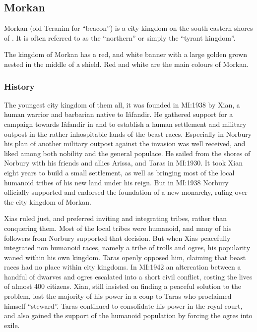 \subsection{Morkan}
\label{sec:Morkan}


Morkan (old Teranim for ``beacon'') is a city kingdom on the south eastern
shores of . It is often referred to as the ``northern''
or simply the ``tyrant kingdom''.

The kingdom of Morkan has a red, and white banner with a large golden grown
nested in the middle of a shield. Red and white are the main colours of
Morkan.

\subsubsection{History}

The youngest city kingdom of them all, it was founded in MI:1938 by Xian, a
human warrior and barbarian native to Iâfandir. He gathered support for a
campaign towards Iâfandir in  and 
to establish a human settlement and military outpost in the rather
inhospitable lands of the beast races. Especially in Norbury his plan of
another military outpost against the invasion was well received, and liked
among both nobility and the general populace. He sailed from the shores of
Norbury with his friends and allies Arissa, and Taras in MI:1930. It took Xian
eight years to build a small settlement, as well as bringing most of the local
humanoid tribes of his new land under his reign. But in MI:1938 Norbury
officially supported and endorsed the foundation of a new monarchy, ruling
over the city kingdom of Morkan.

Xias ruled just, and preferred inviting and integrating tribes, rather than
conquering them. Most of the local tribes were humanoid, and many of his
followers from Norbury supported that decision. But when Xias peacefully
integrated non humanoid races, namely a tribe of trolls and ogres, his
popularity waned within his own kingdom. Taras openly opposed him, claiming
that beast races had no place within city kingdoms. In MI:1942 an
altercation between a handful of dwarves and ogres escalated into a short
civil conflict, costing the lives of almost 400 citizens. Xian, still insisted
on finding a peaceful solution to the problem, lost the majority of his power
in a coup to Taras who proclaimed himself ``steward''. Taras continued to
consolidate his power in the royal court, and also gained the support of the
humanoid population by forcing the ogres into exile.

